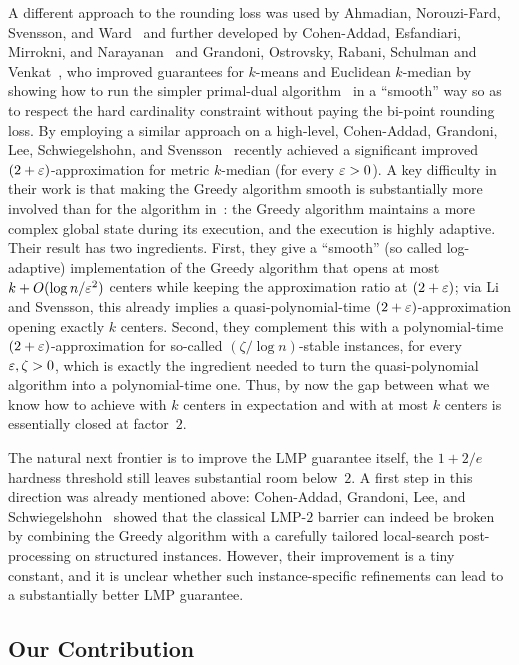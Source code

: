A different approach to the rounding loss was used by Ahmadian, Norouzi-Fard, Svensson, and Ward~\cite{AhmadianNSW20} and further developed by Cohen-Addad, Esfandiari, Mirrokni, and Narayanan~\cite{Cohen-AddadEMN22} and Grandoni, Ostrovsky, Rabani, Schulman and Venkat~\cite{GrandoniORSV22}, who improved guarantees for $k$-means and Euclidean $k$-median by showing how to run the simpler primal-dual algorithm~\cite{JaV01} in a ``smooth'' way so as to respect the hard cardinality constraint without paying the bi-point rounding loss.
By employing a similar approach on a high-level, Cohen-Addad, Grandoni, Lee, Schwiegelshohn, and Svensson~\cite{MR4928455-Cohen25} recently achieved a significant improved $(2+\varepsilon)$-approximation for metric $k$-median (for every $\varepsilon >0$). A key difficulty in their work is that making the Greedy algorithm smooth is substantially more involved than for the algorithm in~\cite{JaV01}: the Greedy algorithm maintains a more complex global state during its execution, and the execution is highly adaptive. Their result has two ingredients. First, they give a ``smooth'' (so called log-adaptive) implementation of the Greedy algorithm that opens at most $k+O(\log n/\varepsilon^2)$ centers while keeping the approximation ratio at $(2+\varepsilon)$; via Li and Svensson, this already implies a quasi-polynomial-time $(2+\varepsilon)$-approximation opening exactly $k$ centers. Second, they complement this with a polynomial-time $(2+\varepsilon)$-approximation for so-called $(\zeta/\log n)$-stable instances, for every $\varepsilon,\zeta>0$, which is exactly the ingredient needed to turn the quasi-polynomial algorithm into a polynomial-time one. Thus, by now the gap between what we know how to achieve with $k$ centers in expectation and with at most $k$ centers is essentially closed at factor~$2$.




The natural next frontier is to improve the LMP guarantee itself, the $1+2/e$ hardness threshold still leaves substantial room below~$2$. A first step in this direction was already mentioned above: Cohen-Addad, Grandoni, Lee, and Schwiegelshohn~\cite{Cohen-AddadLS23} showed that the classical LMP-$2$ barrier can indeed be broken by combining the Greedy algorithm with a carefully tailored local-search post-processing on structured instances. However, their improvement is a tiny constant, and it is unclear whether such instance-specific refinements can lead to a substantially better LMP guarantee.

\subsection{Our Contribution}


